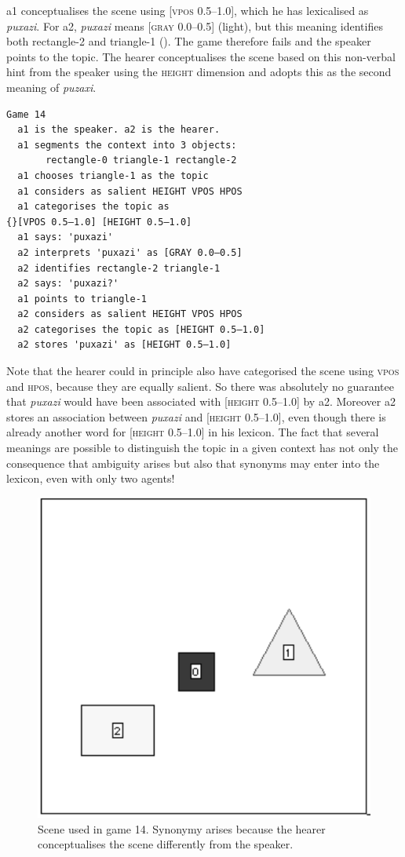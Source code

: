\clearpage 
{\bfshape  a1} conceptualises the scene using 
{}[\textsc{vpos} 0.5–1.0], which he has lexicalised as \textit{puxazi}. 
For {\bfshape  a2}, \textit{puxazi} means [\textsc{gray} 0.0–0.5] (light), but this 
meaning identifies both rectangle-2 and
triangle-1 (). The game therefore
fails and the speaker points to the topic. The hearer
conceptualises the scene based on this non-verbal
hint from the speaker using the \textsc{height} dimension and adopts this as the second meaning 
of \textit{puzaxi}. 
\begin{verbatim}
Game 14
  a1 is the speaker. a2 is the hearer. 
  a1 segments the context into 3 objects: 
       rectangle-0 triangle-1 rectangle-2
  a1 chooses triangle-1 as the topic 
  a1 considers as salient HEIGHT VPOS HPOS 
  a1 categorises the topic as 
{}[VPOS 0.5–1.0] [HEIGHT 0.5–1.0]
  a1 says: 'puxazi'
  a2 interprets 'puxazi' as [GRAY 0.0–0.5]
  a2 identifies rectangle-2 triangle-1
  a2 says: 'puxazi?'
  a1 points to triangle-1
  a2 considers as salient HEIGHT VPOS HPOS 
  a2 categorises the topic as [HEIGHT 0.5–1.0]
  a2 stores 'puxazi' as [HEIGHT 0.5–1.0]
\end{verbatim}
Note that the hearer could in principle 
also have categorised the
scene using \textsc{vpos} and \textsc{hpos}, because they are
equally salient. So there was absolutely no 
guarantee that \textit{puxazi} would have been associated 
with [\textsc{height} 0.5–1.0] by {\bfshape  a2}. Moreover {\bfshape  a2} stores
an association between \textit{puxazi} and [\textsc{height} 0.5–1.0], even though 
there is already another word for 
{}[\textsc{height} 0.5–1.0] in his lexicon. The fact that 
several meanings are possible to distinguish the topic in a given 
context has not only the consequence that ambiguity
arises but also that synonyms may enter into the lexicon, 
even with only two agents!


\begin{figure}[htbp]
  \centerline{\includegraphics[width=.40\textwidth]{chap6/figs/scene-game14.pdf}}
\caption{\label{scene-game14}Scene used
in game 14. Synonymy arises because the hearer conceptualises
the scene differently from the speaker.}
\end{figure}

